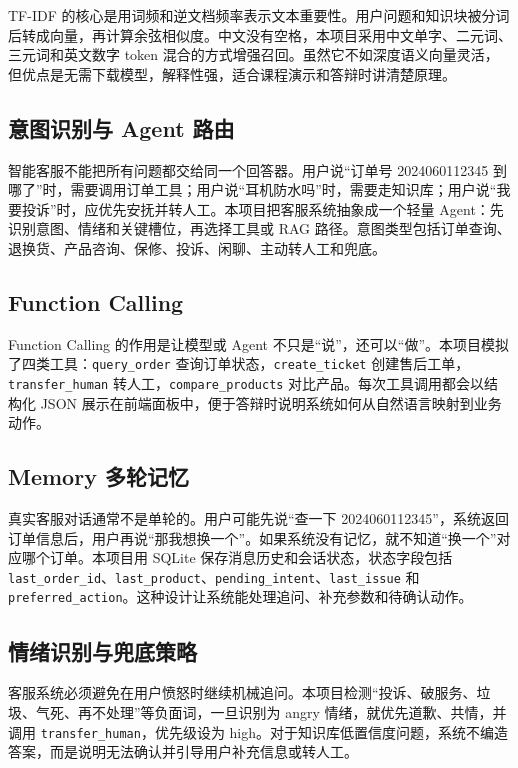 \documentclass[12pt,a4paper]{ctexart}
\begin{document}
TF-IDF 的核心是用词频和逆文档频率表示文本重要性。用户问题和知识块被分词后转成向量，再计算余弦相似度。中文没有空格，本项目采用中文单字、二元词、三元词和英文数字 token 混合的方式增强召回。虽然它不如深度语义向量灵活，但优点是无需下载模型，解释性强，适合课程演示和答辩时讲清楚原理。

\subsection{意图识别与 Agent 路由}

智能客服不能把所有问题都交给同一个回答器。用户说“订单号 2024060112345 到哪了”时，需要调用订单工具；用户说“耳机防水吗”时，需要走知识库；用户说“我要投诉”时，应优先安抚并转人工。本项目把客服系统抽象成一个轻量 Agent：先识别意图、情绪和关键槽位，再选择工具或 RAG 路径。意图类型包括订单查询、退换货、产品咨询、保修、投诉、闲聊、主动转人工和兜底。

\subsection{Function Calling}

Function Calling 的作用是让模型或 Agent 不只是“说”，还可以“做”。本项目模拟了四类工具：\texttt{query\_order} 查询订单状态，\texttt{create\_ticket} 创建售后工单，\texttt{transfer\_human} 转人工，\texttt{compare\_products} 对比产品。每次工具调用都会以结构化 JSON 展示在前端面板中，便于答辩时说明系统如何从自然语言映射到业务动作。

\subsection{Memory 多轮记忆}

真实客服对话通常不是单轮的。用户可能先说“查一下 2024060112345”，系统返回订单信息后，用户再说“那我想换一个”。如果系统没有记忆，就不知道“换一个”对应哪个订单。本项目用 SQLite 保存消息历史和会话状态，状态字段包括 \texttt{last\_order\_id}、\texttt{last\_product}、\texttt{pending\_intent}、\texttt{last\_issue} 和 \texttt{preferred\_action}。这种设计让系统能处理追问、补充参数和待确认动作。

\subsection{情绪识别与兜底策略}

客服系统必须避免在用户愤怒时继续机械追问。本项目检测“投诉、破服务、垃圾、气死、再不处理”等负面词，一旦识别为 angry 情绪，就优先道歉、共情，并调用 \texttt{transfer\_human}，优先级设为 high。对于知识库低置信度问题，系统不编造答案，而是说明无法确认并引导用户补充信息或转人工。
\end{document}
